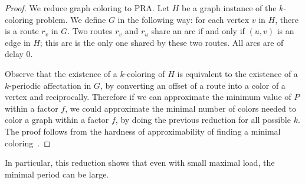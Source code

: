 \documentclass[a4paper,10pt]{article}
\begin{document}
\begin{proof}
 We reduce graph coloring to PRA. Let $H$ be a graph instance of the $k$-coloring problem. 
 We define $G$ in the following way: for each vertex $v$ in $H$, there is a route $r_v$ in $G$.
 Two routes $r_v$ and $r_u$ share an arc if and only if $(u,v)$ is an edge in $H$; this arc is the only one shared by these two routes.   
 All arcs are of delay $0$. 
 
 Observe that the existence of a $k$-coloring of $H$ is equivalent to the existence of a $k$-periodic affectation in $G$, 
 by converting an offset of a route into a color of a vertex and reciprocally. Therefore if we can approximate the minimum value of $P$ within a factor $f$,
 we could approximate the minimal number of colors needed to color a graph within a factor $f$, by doing the previous reduction for all possible $k$. The proof follows from the hardness of approximability of finding a minimal coloring~\cite{zuckerman2006linear}.
\end{proof}


In particular, this reduction shows that even with small maximal load, the 
minimal period can be large.
\end{document}
